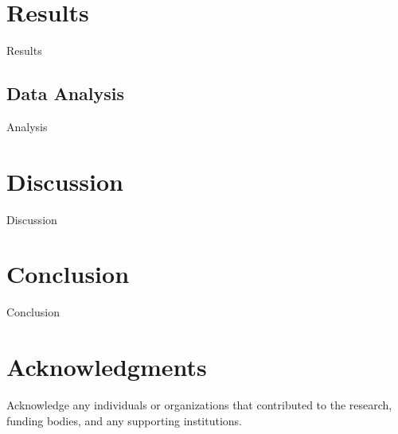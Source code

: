 \documentclass[final, 3p, 11pt]{elsarticle}
\begin{document}
\section{Results}
Results

\subsection{Data Analysis}
Analysis

\section{Discussion}
Discussion

\section{Conclusion}
Conclusion

\section*{Acknowledgments}
Acknowledge any individuals or organizations that contributed to the research, funding bodies, and any supporting institutions.

\newpage

\end{document}
